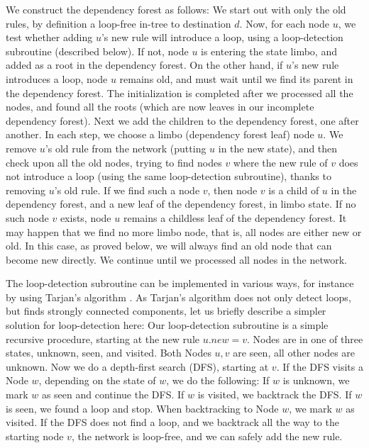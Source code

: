 We construct the dependency forest as follows: We start out with only the old rules, by definition a loop-free in-tree to destination $d$. Now, for each node $u$, we test whether adding $u$'s new rule will introduce a loop, using a loop-detection subroutine (described below). If not, node $u$ is entering the state limbo, and added as a root in the dependency forest. On the other hand, if $u$'s new rule introduces a loop, node $u$ remains old, and must wait until we find its parent in the dependency forest. The initialization is completed after we processed all the nodes, and found all the roots (which are now leaves in our incomplete dependency forest). Next we add the children to the dependency forest, one after another. In each step, we choose a limbo (dependency forest leaf) node $u$. We remove $u$'s old rule from the network (putting $u$ in the new state), and then check upon all the old nodes, trying to find nodes $v$ where the new rule of $v$ does not introduce a loop (using the same loop-detection subroutine), thanks to removing $u$'s old rule. If we find such a node $v$, then node $v$ is a child of $u$ in the dependency forest, and a new leaf of the dependency forest, in limbo state. If no such node $v$ exists, node $u$ remains a childless leaf of the dependency forest. It may happen that we find no more limbo node, that is, all nodes are either new or old. In this case, as proved below, we will always find an old node that can become new directly.
We continue until we processed all nodes in the network.

The loop-detection subroutine can be implemented in various ways, for instance by using
Tarjan's algorithm \cite{tarjan72}. As Tarjan's algorithm does not only detect loops, but finds strongly connected components, let us briefly describe a simpler solution for loop-detection here: Our loop-detection subroutine is a simple recursive procedure, starting at the new rule $u.new = v$. Nodes are in one of three states, unknown, seen, and visited. Both Nodes $u,v$ are seen, all other nodes are unknown. Now we do a depth-first search (DFS), starting at $v$. If the DFS visits a Node $w$, depending on the state of $w$, we do the following: If $w$ is unknown, we mark $w$ as seen and continue the DFS. If $w$ is visited, we backtrack the DFS. If $w$ is seen, we found a loop and stop. When backtracking to Node $w$, we mark $w$ as visited. If the DFS does not find a loop, and we backtrack all the way to the starting node $v$, the network is loop-free, and we can safely add the new rule.


